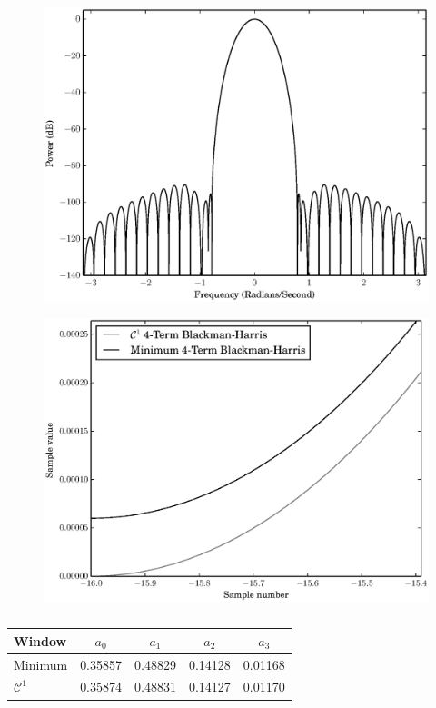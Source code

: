 \begin{figure}[!t]
    \centering
    \includegraphics[width=\figwidthscale\textwidth]{plots/c1_blackman_fd.eps}
    \CaptionWithTitle{%
    }{}
\end{figure}

\begin{figure}[!t]
    \centering
    \includegraphics[width=\figwidthscale\textwidth]{plots/c1_vs_min_blackman_closeup.eps}
    \CaptionWithTitle{%
    }{\label{plot:c1vsminblackmancloseup}}
\end{figure}

\begin{table}
    \caption{\label{tab:optblackman}}
    \begin{center}
        \begin{tabular}{l c c c c }
            Window & $a_0$ & $a_1$ & $a_2$ & $a_3$ \\
            \hline
            Minimum & 0.35857 & 0.48829 & 0.14128 &
            0.01168 \\
            $\mathcal{C}^{1}$ & 0.35874 & 0.48831 &
            0.14127 & 0.01170
        \end{tabular}
    \end{center}
\end{table}


